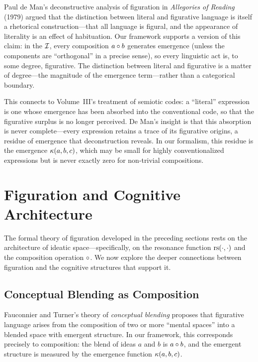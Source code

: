 \begin{interpretation}
\label{interp:de-man-tropes}
Paul de Man's deconstructive analysis of figuration in \textit{Allegories of Reading} (1979) argued that the distinction between literal and figurative language is itself a rhetorical construction---that all language is figural, and the appearance of literality is an effect of habituation.  Our framework supports a version of this claim: in the $\mathcal{I}$, every composition $a \circ b$ generates emergence (unless the components are ``orthogonal'' in a precise sense), so every linguistic act is, to some degree, figurative.  The distinction between literal and figurative is a matter of degree---the magnitude of the emergence term---rather than a categorical boundary.

This connects to Volume~III's treatment of semiotic codes: a ``literal'' expression is one whose emergence has been absorbed into the conventional code, so that the figurative surplus is no longer perceived.  De Man's insight is that this absorption is never complete---every expression retains a trace of its figurative origins, a residue of emergence that deconstruction reveals.  In our formalism, this residue is the emergence $\kappa(a, b, c)$, which may be small for highly conventionalized expressions but is never exactly zero for non-trivial compositions.
\end{interpretation}


\section{Figuration and Cognitive Architecture}

The formal theory of figuration developed in the preceding sections rests on
the architecture of ideatic space---specifically, on the resonance function
$\mathrm{rs}(\cdot, \cdot)$ and the composition operation $\circ$.  We now explore
the deeper connections between figuration and the cognitive structures that
support it.

\subsection{Conceptual Blending as Composition}

Fauconnier and Turner's theory of \emph{conceptual blending} proposes that
figurative language arises from the composition of two or more ``mental
spaces'' into a blended space with emergent structure.  In our framework,
this corresponds precisely to composition: the blend of ideas $a$ and $b$ is
$a \circ b$, and the emergent structure is measured by the emergence
function $\kappa(a, b, c)$.

